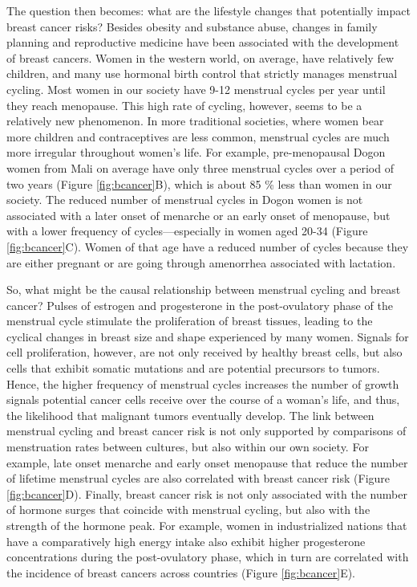 \documentclass[
]{book}
\begin{document}
The question then becomes: what are the lifestyle changes that potentially impact breast cancer risks? Besides obesity and substance abuse, changes in family planning and reproductive medicine have been associated with the development of breast cancers. Women in the western world, on average, have relatively few children, and many use hormonal birth control that strictly manages menstrual cycling. Most women in our society have 9-12 menstrual cycles per year until they reach menopause. This high rate of cycling, however, seems to be a relatively new phenomenon. In more traditional societies, where women bear more children and contraceptives are less common, menstrual cycles are much more irregular throughout women's life. For example, pre-menopausal Dogon women from Mali on average have only three menstrual cycles over a period of two years (Figure \ref{fig:bcancer}B), which is about 85 \% less than women in our society. The reduced number of menstrual cycles in Dogon women is not associated with a later onset of menarche or an early onset of menopause, but with a lower frequency of cycles---especially in women aged 20-34 (Figure \ref{fig:bcancer}C). Women of that age have a reduced number of cycles because they are either pregnant or are going through amenorrhea associated with lactation.

So, what might be the causal relationship between menstrual cycling and breast cancer? Pulses of estrogen and progesterone in the post-ovulatory phase of the menstrual cycle stimulate the proliferation of breast tissues, leading to the cyclical changes in breast size and shape experienced by many women. Signals for cell proliferation, however, are not only received by healthy breast cells, but also cells that exhibit somatic mutations and are potential precursors to tumors. Hence, the higher frequency of menstrual cycles increases the number of growth signals potential cancer cells receive over the course of a woman's life, and thus, the likelihood that malignant tumors eventually develop. The link between menstrual cycling and breast cancer risk is not only supported by comparisons of menstruation rates between cultures, but also within our own society. For example, late onset menarche and early onset menopause that reduce the number of lifetime menstrual cycles are also correlated with breast cancer risk (Figure \ref{fig:bcancer}D). Finally, breast cancer risk is not only associated with the number of hormone surges that coincide with menstrual cycling, but also with the strength of the hormone peak. For example, women in industrialized nations that have a comparatively high energy intake also exhibit higher progesterone concentrations during the post-ovulatory phase, which in turn are correlated with the incidence of breast cancers across countries (Figure \ref{fig:bcancer}E).
\end{document}
